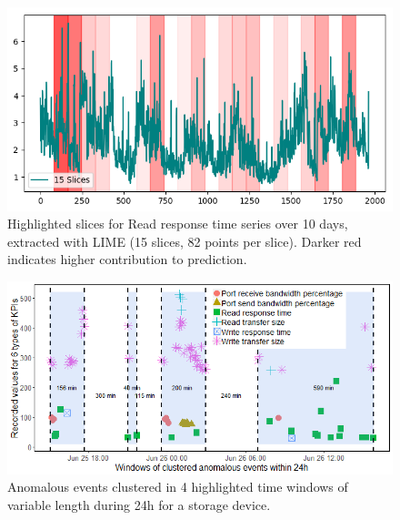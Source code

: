 \documentclass[letterpaper]{article} %
\begin{document}
\begin{figure}
\includegraphics[width=\linewidth]{lime.png}
\caption{Highlighted slices for Read response time series over 10 days, extracted with LIME (15 slices, 82 points per slice). Darker red indicates higher contribution to prediction.}
\label{fig:lime}
\end{figure}


\begin{figure}
\includegraphics[width=\linewidth]{windows-small.png}
\caption{Anomalous events clustered in 4 highlighted time windows of variable length during 24h for a storage device.}
\label{fig:windows}
\end{figure}
\end{document}
